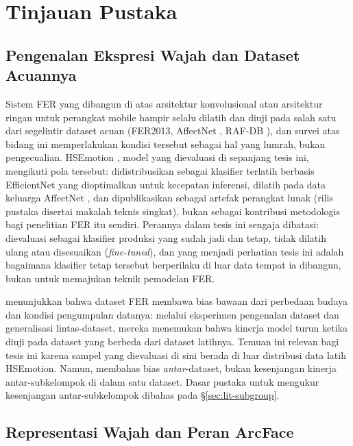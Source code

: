 \chapter{Tinjauan Pustaka}
\label{chap:literature-review}

\section{Pengenalan Ekspresi Wajah dan Dataset Acuannya}

Sistem FER yang dibangun di atas arsitektur konvolusional atau arsitektur ringan untuk perangkat mobile hampir selalu dilatih dan diuji pada salah satu dari segelintir dataset acuan (FER2013, AffectNet \citep{mollahosseini2017affectnet}, RAF-DB \citep{li2017reliable}), dan survei \citet{li2020deep} atas bidang ini memperlakukan kondisi tersebut sebagai hal yang lumrah, bukan pengecualian. HSEmotion \citep{savchenko2022hsemotion}, model yang dievaluasi di sepanjang tesis ini, mengikuti pola tersebut: didistribusikan sebagai klasifier terlatih berbasis EfficientNet yang dioptimalkan untuk kecepatan inferensi, dilatih pada data keluarga AffectNet \citep{mollahosseini2017affectnet}, dan dipublikasikan sebagai artefak perangkat lunak (rilis pustaka disertai makalah teknis singkat), bukan sebagai kontribusi metodologis bagi penelitian FER itu sendiri. Perannya dalam tesis ini sengaja dibatasi: dievaluasi sebagai klasifier produksi yang sudah jadi dan tetap, tidak dilatih ulang atau disesuaikan (\textit{fine-tuned}), dan yang menjadi perhatian tesis ini adalah bagaimana klasifier tetap tersebut berperilaku di luar data tempat ia dibangun, bukan untuk memajukan teknik pemodelan FER.

\citet{li2020deeper} menunjukkan bahwa dataset FER membawa bias bawaan dari perbedaan budaya dan kondisi pengumpulan datanya: melalui eksperimen pengenalan dataset dan generalisasi lintas-dataset, mereka menemukan bahwa kinerja model turun ketika diuji pada dataset yang berbeda dari dataset latihnya. Temuan ini relevan bagi tesis ini karena sampel yang dievaluasi di sini berada di luar distribusi data latih HSEmotion. Namun, \citet{li2020deeper} membahas bias \emph{antar}-dataset, bukan kesenjangan kinerja antar-subkelompok di dalam satu dataset. Dasar pustaka untuk mengukur kesenjangan antar-subkelompok dibahas pada \S\ref{sec:lit-subgroup}.

\section{Representasi Wajah dan Peran ArcFace}

